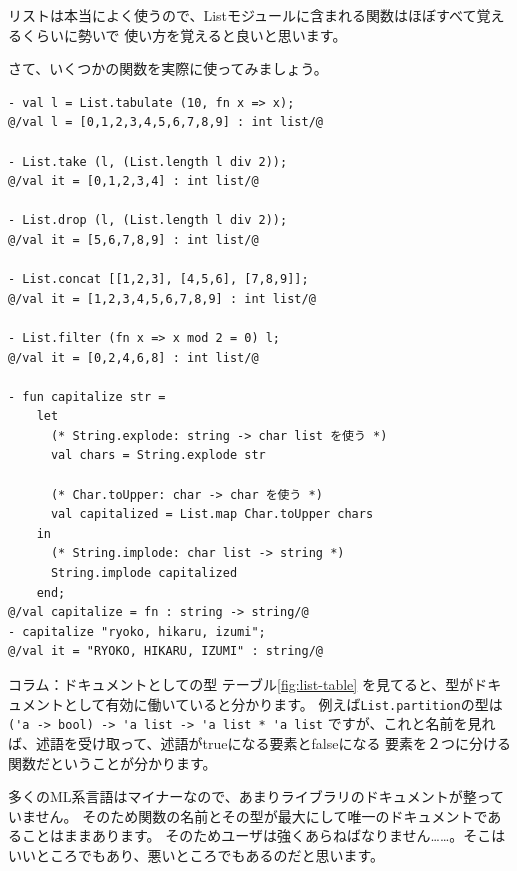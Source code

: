 \documentclass[11pt,a4paper]{article}
\begin{document}
リストは本当によく使うので、Listモジュールに含まれる関数はほぼすべて覚えるくらいに勢いで
使い方を覚えると良いと思います。

さて、いくつかの関数を実際に使ってみましょう。

\begin{lstlisting}[caption=Listモジュール,label=code:list-mod]
- val l = List.tabulate (10, fn x => x);
@/val l = [0,1,2,3,4,5,6,7,8,9] : int list/@

- List.take (l, (List.length l div 2));
@/val it = [0,1,2,3,4] : int list/@

- List.drop (l, (List.length l div 2));
@/val it = [5,6,7,8,9] : int list/@

- List.concat [[1,2,3], [4,5,6], [7,8,9]];
@/val it = [1,2,3,4,5,6,7,8,9] : int list/@

- List.filter (fn x => x mod 2 = 0) l;
@/val it = [0,2,4,6,8] : int list/@

- fun capitalize str =
    let
      (* String.explode: string -> char list を使う *)
      val chars = String.explode str

      (* Char.toUpper: char -> char を使う *)
      val capitalized = List.map Char.toUpper chars
    in
      (* String.implode: char list -> string *)
      String.implode capitalized
    end;
@/val capitalize = fn : string -> string/@
- capitalize "ryoko, hikaru, izumi";
@/val it = "RYOKO, HIKARU, IZUMI" : string/@
\end{lstlisting}

\begin{itembox}[l]{コラム：ドキュメントとしての型}
テーブル\ref{fig:list-table} を見てると、型がドキュメントとして有効に働いていると分かります。
例えば\lstinline{List.partition}の型は\lstinline{('a -> bool) -> 'a list -> 'a list * 'a list}
ですが、これと名前を見れば、述語を受け取って、述語がtrueになる要素とfalseになる
要素を２つに分ける関数だということが分かります。

多くのML系言語はマイナーなので、あまりライブラリのドキュメントが整っていません。
そのため関数の名前とその型が最大にして唯一のドキュメントであることはままあります。
そのためユーザは強くあらねばなりません……。そこはいいところでもあり、悪いところでもあるのだと思います。
\end{itembox}
\end{document}
